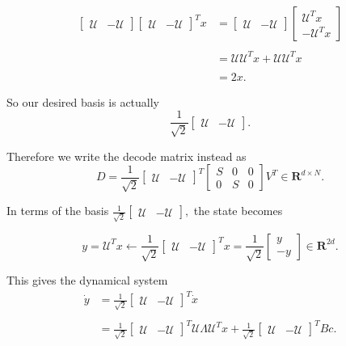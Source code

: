 \begin{enumerate}
\begin{align*}
\begin{bmatrix}
\mathcal{U} & -\mathcal{U}
\end{bmatrix} \begin{bmatrix}
\mathcal{U} & -\mathcal{U}
\end{bmatrix}^T x
&=
\begin{bmatrix}
\mathcal{U} & -\mathcal{U}
\end{bmatrix}
\begin{bmatrix}
\mathcal{U}^T x \\ -\mathcal{U}^T x
\end{bmatrix}
\\
\\
&=
\mathcal{U} \mathcal{U}^T x + \mathcal{U}\mathcal{U}^T x
\\
\\
&=
2x.
\end{align*}

So our desired basis is actually
$$
\frac{1}{\sqrt{2}} 
\begin{bmatrix}
\mathcal{U} & -\mathcal{U}
\end{bmatrix}.
$$

Therefore we write the decode matrix instead as 
$$
D = \frac{1}{\sqrt{2}}\begin{bmatrix}
\mathcal{U} & -\mathcal{U}
\end{bmatrix}^T \begin{bmatrix}
S & 0 & 0
\\
0 & S & 0
\end{bmatrix}
V^T \in \mathbf{R}^{d \times N}.
$$


In terms of the basis $\frac{1}{\sqrt{2}} \begin{bmatrix} \mathcal{U} & -\mathcal{U}\end{bmatrix},$ the state becomes

$$
y = \mathcal{U}^T x \leftarrow \frac{1}{\sqrt{2}}\begin{bmatrix}
\mathcal{U} & -\mathcal{U}
\end{bmatrix}^T x = \frac{1}{\sqrt{2}} \begin{bmatrix}
y\\-y
\end{bmatrix} \in \mathbf{R}^{2d}.
$$


This gives the dynamical system
\begin{align*}
\dot{y} &= \frac{1}{\sqrt{2}} \begin{bmatrix}
\mathcal{U} & -\mathcal{U}
\end{bmatrix}^T \dot{x}
\\
\\
&=
\frac{1}{\sqrt{2}} \begin{bmatrix}
\mathcal{U} & -\mathcal{U}
\end{bmatrix}^T \mathcal{U} \Lambda \mathcal{U}^T x + \frac{1}{\sqrt{2}}  \begin{bmatrix}
\mathcal{U} & -\mathcal{U}
\end{bmatrix}^T B c.
\end{align*}


\end{enumerate}
